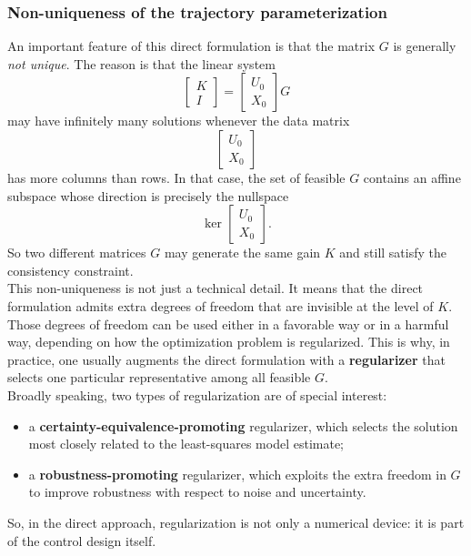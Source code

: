 \subsubsection{Non-uniqueness of the trajectory parameterization}

An important feature of this direct formulation is that the matrix $G$ is generally \emph{not
unique}. The reason is that the linear system
\[
\begin{bmatrix}
K\\[0.3em]
I
\end{bmatrix}
=
\begin{bmatrix}
U_0\\[0.3em]
X_0
\end{bmatrix}G
\]
may have infinitely many solutions whenever the data matrix
\[
\begin{bmatrix}
U_0\\[0.3em]
X_0
\end{bmatrix}
\]
has more columns than rows. In that case, the set of feasible $G$ contains an affine subspace
whose direction is precisely the nullspace
\[
\ker\!\begin{bmatrix}
U_0\\[0.3em]
X_0
\end{bmatrix}.
\]
So two different matrices $G$ may generate the same gain $K$ and still satisfy the consistency
constraint.\\
This non-uniqueness is not just a technical detail. It means that the direct formulation admits
extra degrees of freedom that are invisible at the level of $K$. Those degrees of freedom can be
used either in a favorable way or in a harmful way, depending on how the optimization problem
is regularized. This is why, in practice, one usually augments the direct formulation with a
\textbf{regularizer} that selects one particular representative among all feasible $G$.\\

Broadly speaking, two types of regularization are of special interest:
\begin{itemize}
    \item a \textbf{certainty-equivalence-promoting} regularizer, which selects the solution most closely
    related to the least-squares model estimate;
    \item a \textbf{robustness-promoting} regularizer, which exploits the extra freedom in $G$ to improve
    robustness with respect to noise and uncertainty.
\end{itemize}
So, in the direct approach, regularization is not only a numerical device: it is part of the control
design itself.

